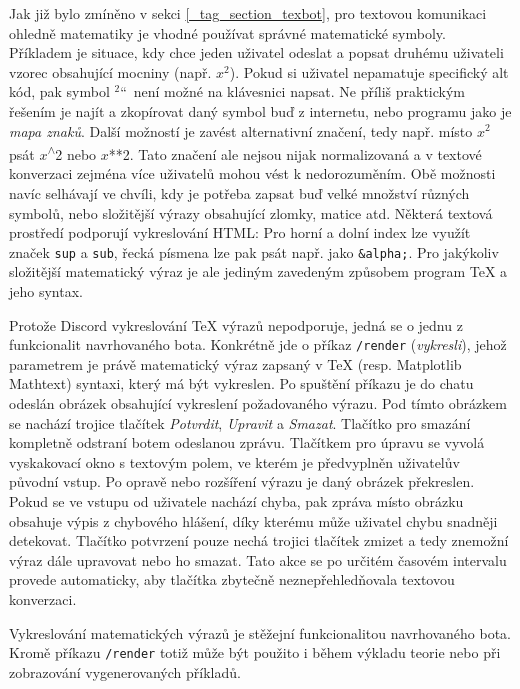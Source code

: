 \documentclass[FM]{tulthesis}
\begin{document}
	Jak již bylo zmíněno v sekci \ref{_tag_section_texbot}, pro textovou komunikaci ohledně matematiky je vhodné používat správné matematické symboly. Příkladem je situace, kdy chce jeden uživatel odeslat a popsat druhému uživateli vzorec obsahující mocniny (např. $x^2$). Pokud si uživatel nepamatuje specifický alt kód, pak symbol \quotedblbase$^2$\textquotedblleft\ není možné na klávesnici napsat. Ne příliš praktickým řešením je najít a zkopírovat daný symbol buď z internetu, nebo programu jako je \textit{mapa znaků}. Další možností je zavést alternativní značení, tedy např. místo $x^2$ psát $x$\textsuperscript{$\wedge$}2 nebo $x$**2. Tato značení ale nejsou nijak normalizovaná a v textové konverzaci zejména více uživatelů mohou vést k nedorozuměním. Obě možnosti navíc selhávají ve chvíli, kdy je potřeba zapsat buď velké množství různých symbolů, nebo složitější výrazy obsahující zlomky, matice atd. Některá textová prostředí podporují vykreslování HTML: Pro horní a dolní index lze využít značek \verb*|sup| a \verb*|sub|, řecká písmena lze pak psát např. jako \verb*|&alpha;|. Pro jakýkoliv složitější matematický výraz je ale jediným zavedeným způsobem program TeX a jeho syntax.
	
	Protože Discord vykreslování TeX výrazů nepodporuje, jedná se o jednu z funkcionalit navrhovaného bota. Konkrétně jde o příkaz \verb*|/render| (\textit{vykresli}), jehož parametrem je právě matematický výraz zapsaný v TeX (resp. Matplotlib Mathtext) syntaxi, který má být vykreslen. Po spuštění příkazu je do chatu odeslán obrázek obsahující vykreslení požadovaného výrazu. Pod tímto obrázkem se nachází trojice tlačítek \textit{Potvrdit}, \textit{Upravit} a \textit{Smazat}. Tlačítko pro smazání kompletně odstraní botem odeslanou zprávu. Tlačítkem pro úpravu se vyvolá vyskakovací okno s textovým polem, ve kterém je předvyplněn uživatelův původní vstup. Po opravě nebo rozšíření výrazu je daný obrázek překreslen. Pokud se ve vstupu od uživatele nachází chyba, pak zpráva místo obrázku obsahuje výpis z chybového hlášení, díky kterému může uživatel chybu snadněji detekovat. Tlačítko potvrzení pouze nechá trojici tlačítek zmizet a tedy znemožní výraz dále upravovat nebo ho smazat. Tato akce se po určitém časovém intervalu provede automaticky, aby tlačítka zbytečně neznepřehledňovala textovou konverzaci.
	
	Vykreslování matematických výrazů je stěžejní funkcionalitou navrhovaného bota. Kromě příkazu \verb*|/render| totiž může být použito i během výkladu teorie nebo při zobrazování vygenerovaných příkladů.
	
\end{document}
